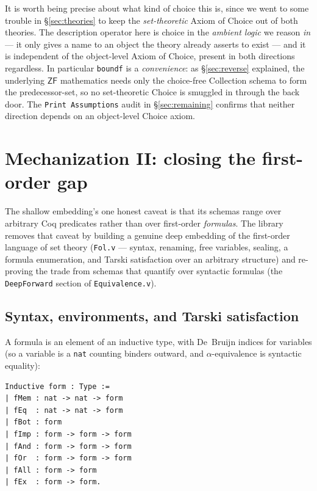 \documentclass[11pt]{article}
\theoremstyle{plain}
\theoremstyle{definition}
\newcommand{\ZF}{\mathsf{ZF}}
\renewcommand{\ZF}{\textsf{ZF}}
\newcommand{\cq}[1]{\lstinline[basicstyle=\ttfamily]|#1|}
\begin{document}
It is worth being precise about what kind of choice this is, since we went to some
trouble in \S\ref{sec:theories} to keep the \emph{set-theoretic} Axiom of Choice out
of both theories. The description operator here is choice in the \emph{ambient
logic} we reason \emph{in} --- it only gives a name to an object the theory already
asserts to exist --- and it is independent of the object-level Axiom of Choice,
present in both directions regardless. In particular \cq{boundf} is a
\emph{convenience}: as \S\ref{sec:reverse} explained, the underlying $\ZF$
mathematics needs only the choice-free Collection schema to form the
predecessor-set, so no set-theoretic Choice is smuggled in through the back door.
The \cq{Print Assumptions} audit in \S\ref{sec:remaining} confirms that neither
direction depends on an object-level Choice axiom.

\section{Mechanization II: closing the first-order gap}\label{sec:mech-deep}

The shallow embedding's one honest caveat is that its schemas range over arbitrary
Coq predicates rather than over first-order \emph{formulas}. The library removes
that caveat by building a genuine deep embedding of the first-order language of
set theory (\texttt{Fol.v} --- syntax, renaming, free variables, sealing, a
formula enumeration, and Tarski satisfaction over an arbitrary structure) and
re-proving the trade from schemas that quantify over syntactic formulas
(the \cq{DeepForward} section of \texttt{Equivalence.v}).

\subsection{Syntax, environments, and Tarski satisfaction}

A formula is an element of an inductive type, with De~Bruijn indices for variables
(so a variable is a \cq{nat} counting binders outward, and $\alpha$-equivalence is
syntactic equality):

\begin{lstlisting}
Inductive form : Type :=
| fMem : nat -> nat -> form
| fEq  : nat -> nat -> form
| fBot : form
| fImp : form -> form -> form
| fAnd : form -> form -> form
| fOr  : form -> form -> form
| fAll : form -> form
| fEx  : form -> form.
\end{lstlisting}
\end{document}
